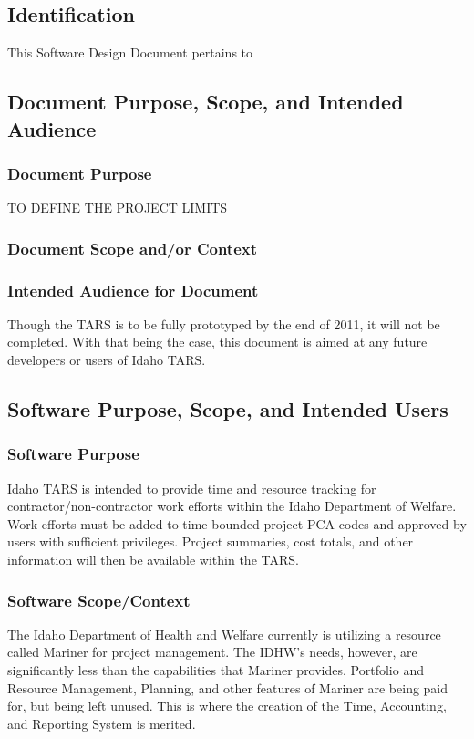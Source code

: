 \documentclass[letterpaper]{article}
\begin{document}
\subsection{\bfseries{Identification}}
This Software Design Document pertains to 
\subsection{\bfseries{Document Purpose, Scope, and Intended Audience}}
\subsubsection{Document Purpose}
TO DEFINE THE PROJECT LIMITS

\subsubsection{Document Scope and/or Context}


\subsubsection{Intended Audience for Document}
Though the TARS is to be fully prototyped by the end of 2011, it will not be completed. With that being the case, this document is aimed at any future developers or users of Idaho TARS. 

\subsection{\bfseries{Software Purpose, Scope, and Intended Users}}
\subsubsection{Software Purpose}
Idaho TARS is intended to provide time and resource tracking for contractor/non-contractor work efforts within the Idaho Department of Welfare. Work efforts must be added to time-bounded project PCA codes and approved by users with sufficient privileges. Project summaries, cost totals, and other information will then be available within the TARS.     

\subsubsection{Software Scope/Context}
The Idaho Department of Health and Welfare currently is utilizing a resource called Mariner for project management. The IDHW's needs, however, are significantly less than the capabilities that Mariner provides. Portfolio and Resource Management, Planning, and other features of Mariner are being paid for, but being left unused. This is where the creation of the Time, Accounting, and Reporting System is merited. 
\end{document}
